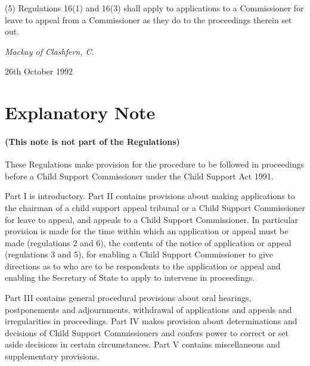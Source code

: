 \documentclass[12pt,a4paper]{article}
\begin{document}
(5) Regulations 16(1) and 16(3) shall apply to applications to a Commissioner for leave to appeal from a Commissioner as they do to the proceedings therein set out.

\bigskip

{\raggedleft
\emph{Mackay of Clashfern, C.}


}

26th October 1992

\small

\part{Explanatory Note}

\renewcommand\parthead{--- Explanatory Note}

\subsection*{(This note is not part of the Regulations)}

 These Regulations make provision for the procedure to be followed in proceedings before a Child Support Commissioner under the Child Support Act 1991.

  Part I is introductory. Part II contains provisions about making applications to the chairman of a child support appeal tribunal or a Child Support Commissioner for leave to appeal, and appeals to a Child Support Commissioner. In particular provision is made for the time within which an application or appeal must be made (regulations 2 and 6), the contents of the notice of application or appeal (regulations 3 and 5), for enabling a Child Support Commissioner to give directions as to who are to be respondents to the application or appeal and enabling the Secretary of State to apply to intervene in proceedings.

  Part III contains general procedural provisions about oral hearings, postponements and adjournments, withdrawal of applications and appeals and irregularities in proceedings. Part IV makes provision about determinations and decisions of Child Support Commissioners and confers power to correct or set aside decisions in certain circumstances. Part V contains miscellaneous and supplementary provisions.
\end{document}
